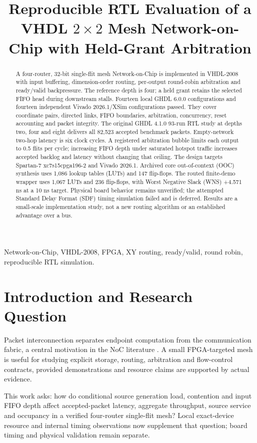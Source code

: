 \documentclass[conference,a4paper]{IEEEtran}
\title{Reproducible RTL Evaluation of a VHDL $2\times 2$ Mesh Network-on-Chip with Held-Grant Arbitration}
\author{\IEEEauthorblockN{Anjor Giri, Nidhi Kanoujia, Deven Gaikwad}
\IEEEauthorblockA{Department of Electronics and Communication Engineering\\
School of Engineering and Technology\\
DES Pune University, Pune, India}}
\begin{document}
\maketitle
\begin{abstract}
A four-router, 32-bit single-flit mesh Network-on-Chip is implemented in VHDL-2008 with input buffering, dimension-order routing, per-output round-robin arbitration and ready/valid backpressure. The reference depth is four; a held grant retains the selected FIFO head during downstream stalls. Fourteen local GHDL 6.0.0 configurations and fourteen independent Vivado 2026.1/XSim configurations passed. They cover coordinate pairs, directed links, FIFO boundaries, arbitration, concurrency, reset accounting and packet integrity. The original GHDL 4.1.0 93-run RTL study at depths two, four and eight delivers all 82,523 accepted benchmark packets. Empty-network two-hop latency is six clock cycles. A registered arbitration bubble limits each output to 0.5 flits per cycle; increasing FIFO depth under saturated hotspot traffic increases accepted backlog and latency without changing that ceiling. The design targets Spartan-7 xc7s15cpga196-2 and Vivado 2026.1. Archived core out-of-context (OOC) synthesis uses 1,086 lookup tables (LUTs) and 147 flip-flops. The routed finite-demo wrapper uses 1,067 LUTs and 236 flip-flops, with Worst Negative Slack (WNS) +4.571 ns at a 10 ns target. Physical board behavior remains unverified; the attempted Standard Delay Format (SDF) timing simulation failed and is deferred. Results are a small-scale implementation study, not a new routing algorithm or an established advantage over a bus.
\end{abstract}
\begin{IEEEkeywords}
Network-on-Chip, VHDL-2008, FPGA, XY routing, ready/valid, round robin, reproducible RTL simulation.
\end{IEEEkeywords}
\section{Introduction and Research Question}
Packet interconnection separates endpoint computation from the communication fabric, a central motivation in the NoC literature \cite{benini2002,dally2001}. A small FPGA-targeted mesh is useful for studying explicit storage, routing, arbitration and flow-control contracts, provided demonstrations and resource claims are supported by actual evidence.

This work asks: how do conditional source generation load, contention and input FIFO depth affect accepted-packet latency, aggregate throughput, source service and occupancy in a verified four-router single-flit mesh? Local exact-device resource and internal timing observations now supplement that question; board timing and physical validation remain separate.
\end{document}
